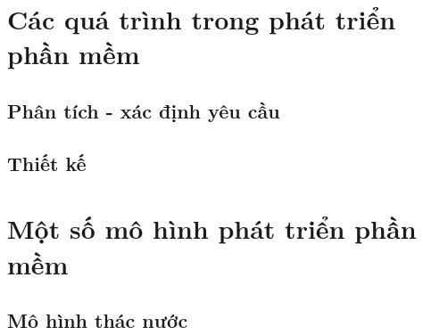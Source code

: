     \section{Các quá trình trong phát triển phần mềm}
        \subsection{Phân tích - xác định yêu cầu}
        
        \subsection{Thiết kế}

    \section{Một số mô hình phát triển phần mềm}
        \subsection{Mô hình thác nước}

